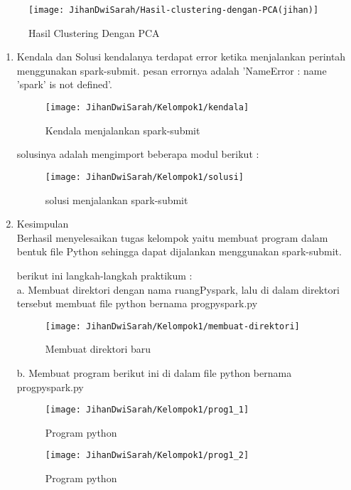 \begin{figure}[!ht]
\texttt{[image: JihanDwiSarah/Hasil-clustering-dengan-PCA(jihan)]}
\caption{Hasil Clustering Dengan PCA}
\label{gam:Hasil-clustering-dengan-PCA(jihan)}
\end{figure}


\begin{enumerate}
\item Kendala dan Solusi
\newline kendalanya terdapat error ketika menjalankan perintah menggunakan spark-submit. pesan errornya adalah 'NameError : name 'spark' is not defined'.
\begin{figure}[!ht]
\texttt{[image: JihanDwiSarah/Kelompok1/kendala]}
\caption{Kendala menjalankan spark-submit}
\label{gam:kendala}
\end{figure} 
\newpage
solusinya adalah mengimport beberapa modul berikut :
\begin{figure}[!ht]
\texttt{[image: JihanDwiSarah/Kelompok1/solusi]}
\caption{solusi menjalankan spark-submit}
\label{gam:solusi}
\end{figure} 

\item Kesimpulan \\
Berhasil menyelesaikan tugas kelompok yaitu membuat program dalam bentuk file Python sehingga
dapat dijalankan menggunakan spark-submit.

berikut ini langkah-langkah praktikum :\\
a. Membuat direktori dengan nama ruangPyspark, lalu di dalam direktori tersebut membuat file python bernama progpyspark.py
\begin{figure}[!ht]
\texttt{[image: JihanDwiSarah/Kelompok1/membuat-direktori]}
\caption{Membuat direktori baru}
\label{gam:membuat-direktori}
\end{figure} 


b. Membuat program berikut ini di dalam file python bernama progpyspark.py
\begin{figure}[!ht]
\texttt{[image: JihanDwiSarah/Kelompok1/prog1\_1]}
\caption{Program python}
\label{gam:prog1_1}
\end{figure} 

\newpage
\begin{figure}[!ht]
\texttt{[image: JihanDwiSarah/Kelompok1/prog1\_2]}
\caption{Program python}
\label{gam:prog1_2}
\end{figure}



\end{enumerate}
